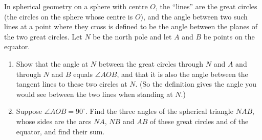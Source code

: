 In spherical geometry on a sphere with centre $O$, the ``lines'' are the great circles (the circles on the sphere whose centre is $O$), and the angle between two such lines at a point where they cross is defined to be the angle between the planes of the two great circles. Let $N$ be the north pole and let $A$ and $B$ be points on the equator.
\begin{enumerate}
\item[(a)] Show that the angle at $N$ between the great circles through $N$ and $A$ and through $N$ and $B$ equals $\angle AOB$, and that it is also the angle between the tangent lines to these two circles at $N$. (So the definition gives the angle you would see between the two lines when standing at $N$.)
\item[(b)] Suppose $\angle AOB=90^\circ$. Find the three angles of the spherical triangle $NAB$, whose sides are the arcs $NA$, $NB$ and $AB$ of these great circles and of the equator, and find their sum.
\end{enumerate}
